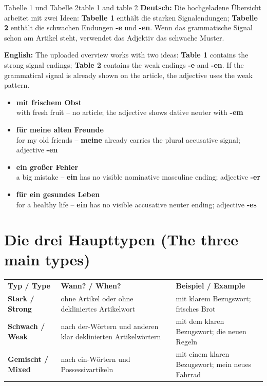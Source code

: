 \documentclass[a4paper,11pt]{article}
\newcommand{\GermanText}[1]{\textbf{Deutsch: }#1\par}
\newcommand{\EnglishText}[1]{{\small\color{SoftGray}\textbf{English: }#1\par}}
\newcommand{\ExampleItem}[2]{\item \textbf{#1}\\{\small\color{SoftGray}#2}}
\begin{document}
\begin{grammarentry}{Tabelle 1 und Tabelle 2}{table 1 and table 2}
\GermanText{Die hochgeladene Übersicht arbeitet mit zwei Ideen: \textbf{Tabelle 1} enthält die starken Signalendungen; \textbf{Tabelle 2} enthält die schwachen Endungen \textbf{-e} und \textbf{-en}. Wenn das grammatische Signal schon am Artikel steht, verwendet das Adjektiv das schwache Muster.}
\EnglishText{The uploaded overview works with two ideas: \textbf{Table 1} contains the strong signal endings; \textbf{Table 2} contains the weak endings \textbf{-e} and \textbf{-en}. If the grammatical signal is already shown on the article, the adjective uses the weak pattern.}
\end{grammarentry}

\begin{exbox}
\begin{itemize}
\ExampleItem{mit frischem Obst}{with fresh fruit -- no article; the adjective shows dative neuter with \textbf{-em}}
\ExampleItem{für meine alten Freunde}{for my old friends -- \textbf{meine} already carries the plural accusative signal; adjective \textbf{-en}}
\ExampleItem{ein großer Fehler}{a big mistake -- \textbf{ein} has no visible nominative masculine ending; adjective \textbf{-er}}
\ExampleItem{für ein gesundes Leben}{for a healthy life -- \textbf{ein} has no visible accusative neuter ending; adjective \textbf{-es}}
\end{itemize}
\end{exbox}

\section{Die drei Haupttypen \textnormal{(The three main types)}}

\begin{longtable}{>{\bfseries}p{3.2cm}|p{5.2cm}|p{6.4cm}}
\rowcolor{HeaderBlueDark}
\color{white}\textbf{Typ / Type} &
\color{white}\textbf{Wann? / When?} &
\color{white}\textbf{Beispiel / Example} \\
Stark / Strong & ohne Artikel oder ohne dekliniertes Artikelwort & mit klarem Bezugswort; frisches Brot \\
Schwach / Weak & nach der-Wörtern und anderen klar deklinierten Artikelwörtern & mit dem klaren Bezugswort; die neuen Regeln \\
Gemischt / Mixed & nach ein-Wörtern und Possessivartikeln & mit einem klaren Bezugswort; mein neues Fahrrad \\
\end{longtable}
\end{document}
